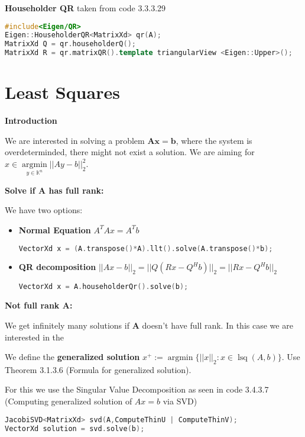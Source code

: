 \documentclass{sciposter}
\renewcommand{\vec}[1]{\mathbf{#1}}
\newcommand{\psection}[1]{\par \textbf{\large#1}}
\begin{document}
\begin{multicols}{2}
\psection{Householder QR}
taken from code 3.3.3.29
\begin{lstlisting}[language=c++]
#include<Eigen/QR>
Eigen::HouseholderQR<MatrixXd> qr(A);
MatrixXd Q = qr.householderQ();
MatrixXd R = qr.matrixQR().template triangularView <Eigen::Upper>();
\end{lstlisting}


\section*{Least Squares}

\psection{Introduction}

We are interested in solving a problem $\vec{A} \vec{x} = \vec{b}$, where the system is overdeterminded, there might not exist a solution. We are aiming for $x \in \operatorname{argmin}\limits_{y\in \mathbb{K}^n} ||Ay - b||_2 ^2$.


\psection{Solve if $\vec{A}$ has full rank:}

We have two options:

\begin{itemize}
	\item \textbf{Normal Equation} $A^T Ax = A^T b$
	\begin{lstlisting}[language=c++]
	VectorXd x = (A.transpose()*A).llt().solve(A.transpose()*b);
	\end{lstlisting}
	\item \textbf{QR decomposition} $||Ax-b||_2 = ||Q(Rx - Q^H b)||_2 = ||Rx - Q^H b||_2$
	\begin{lstlisting}[language=c++]
	VectorXd x = A.householderQr().solve(b);
	\end{lstlisting}
\end{itemize}



\psection{Not full rank $\vec{A}$:}

We get infinitely many solutions if $\vec{A}$ doesn't have full rank. In this case we are interested in the 

\begin{mdframed}
	We define the \textbf{generalized solution} $x^+ := \operatorname{argmin}\{ ||x||_2 : x\in \operatorname{lsq}(A,b)\}$. Use Theorem 3.1.3.6 (Formula for generalized solution).
\end{mdframed}

For this we use the Singular Value Decomposition as seen in code 3.4.3.7 (Computing generalized solution of $Ax=b$ via SVD)


\begin{lstlisting}[language=c++]
JacobiSVD<MatrixXd> svd(A,ComputeThinU | ComputeThinV);
VectorXd solution = svd.solve(b);
\end{lstlisting}


\end{multicols}
\end{document}
